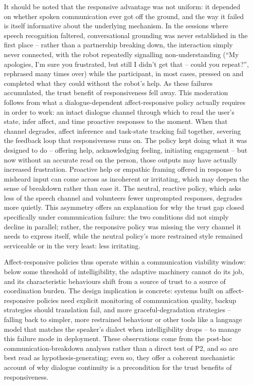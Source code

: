 \documentclass[
  authoryear,
  doubleblind,
  3p]{elsarticle}
\begin{document}
It should be noted that the responsive advantage was not uniform: it
depended on whether spoken communication ever got off the ground, and
the way it failed is itself informative about the underlying mechanism.
In the sessions where speech recognition faltered, conversational
grounding was never established in the first place -- rather than a
partnership breaking down, the interaction simply never connected, with
the robot repeatedly signalling non-understanding (``My apologies, I'm
sure you frustrated, but still I didn't get that -- could you repeat?'',
rephrased many times over) while the participant, in most cases, pressed
on and completed what they could without the robot's help. As these
failures accumulated, the trust benefit of responsiveness fell away.
This moderation follows from what a dialogue-dependent affect-responsive
policy actually requires in order to work: an intact dialogue channel
through which to read the user's state, infer affect, and time proactive
responses to the moment. When that channel degrades, affect inference
and task-state tracking fail together, severing the feedback loop that
responsiveness runs on. The policy kept doing what it was designed to do
-- offering help, acknowledging feeling, initiating engagement -- but
now without an accurate read on the person, those outputs may have
actually increased frustration. Proactive help or empathic framing
offered in response to misheard input can come across as incoherent or
irritating, which may deepen the sense of breakdown rather than ease it.
The neutral, reactive policy, which asks less of the speech channel and
volunteers fewer unprompted responses, degrades more quietly. This
asymmetry offers an explanation for why the trust gap closed
specifically under communication failure: the two conditions did not
simply decline in parallel; rather, the responsive policy was missing
the very channel it needs to express itself, while the neutral policy's
more restrained style remained serviceable or in the very least: less
irritating.

Affect-responsive policies thus operate within a communication viability
window: below some threshold of intelligibility, the adaptive machinery
cannot do its job, and its characteristic behaviours shift from a source
of trust to a source of coordination burden. The design implication is
concrete: systems built on affect-responsive policies need explicit
monitoring of communication quality, backup strategies should
translation fail, and more graceful-degradation strategies -- falling
back to simpler, more restrained behaviour or other tools like a
language model that matches the speaker's dialect when intelligibility
drops -- to manage this failure mode in deployment. These observations
come from the post-hoc communication-breakdown analyses rather than a
direct test of P2, and so are best read as hypothesis-generating; even
so, they offer a coherent mechanistic account of why dialogue continuity
is a precondition for the trust benefits of responsiveness.
\end{document}
